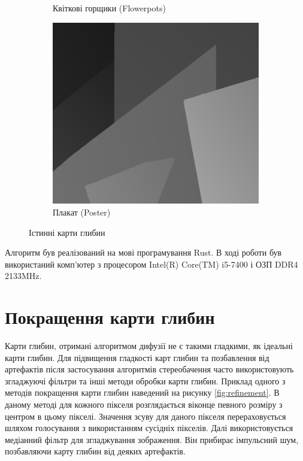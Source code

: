 \begin{figure}[h]
\begin{subfigure}[t]{0.32\textwidth}
        \caption{Квіткові горщики (Flowerpots)}
        \label{fig:flowerpots:ground:truth}
    \end{subfigure}
    \hfill
    \begin{subfigure}[t]{0.32\textwidth}
        \centering
        \includegraphics[width=\textwidth]{images/poster_ground_truth}
        \caption{Плакат (Poster)}
        \label{fig:poster:ground:truth}
    \end{subfigure}
    \caption{Істинні карти глибин}
    \label{fig:ground:truth}
\end{figure}

Алгоритм був реалізований на мові програмування Rust.
В ході роботи був використаний комп'ютер з процесором
Intel(R) Core(TM) i5-7400 і ОЗП DDR4 2133MHz.

\section{Покращення карти глибин}

Карти глибин, отримані алгоритмом дифузії не є такими гладкими,
як ідеальні карти глибин.
Для підвищення гладкості карт глибин та позбавлення від артефактів
після застосування алгоритмів стереобачення
часто використовують згладжуючі фільтри та інші методи обробки карти глибин.
Приклад одного з методів покращення карти глибин \cite{refinement}
наведений на рисунку \ref{fig:refinement}.
В даному методі для кожного пікселя розглядається
віконце певного розміру з центром в цьому пікселі.
Значення зсуву для даного пікселя перераховується шляхом голосування
з використанням сусідніх пікселів.
Далі використовується медіанний фільтр для згладжування зображення.
Він прибирає імпульсний шум, позбавляючи карту глибин від деяких артефактів.

